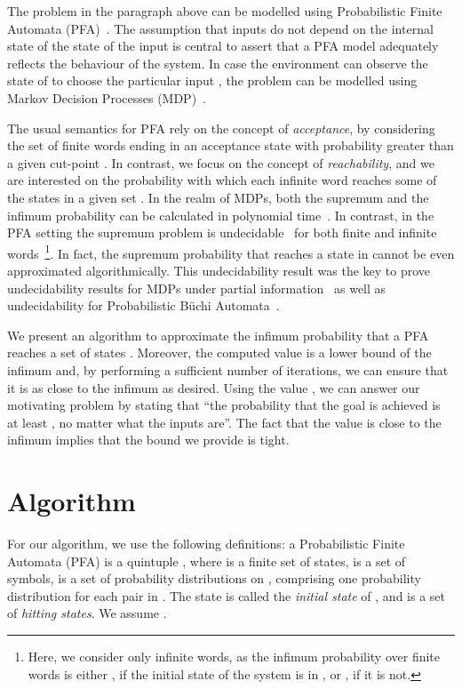 \documentclass[final,3p,times,twocolumn]{elsarticle}
\theoremstyle{plain}
\theoremstyle{definition}
\begin{document}
The problem in the paragraph above can be modelled using Probabilistic Finite
Automata (PFA)~\cite{DBLP:journals/iandc/Rabin63,DBLP:journals/ai/MadaniHC03}.
The assumption that inputs do not depend on the internal state of the
state of the input is central to assert that a PFA model adequately
reflects the behaviour of the system. In case the environment can observe
the state of  to choose the particular input , the problem
can be modelled using Markov Decision Processes (MDP)~\cite{BOOK:Puterman}.


The usual semantics for PFA rely on the concept of \emph{acceptance},
by considering the set of finite words ending in an acceptance state
with probability greater than a given cut-point . In contrast,
we focus on the concept of \emph{reachability}, and we are interested
on the probability with which each infinite word reaches some of the states
in a given set . In the realm of MDPs, both the supremum and
the infimum probability can be calculated in polynomial
time~\cite{DBLP:conf/fsttcs/BiancoA95}. In contrast, in the PFA setting
the supremum problem is undecidable~\cite{DBLP:journals/ai/MadaniHC03} for
both finite and infinite words~\footnote{Here, we consider only infinite words,
as the infimum probability over finite words is either , if the initial
state of the system is in , or , if it is not.}.
In fact, the supremum probability that  reaches a state in
 cannot be even approximated algorithmically. This undecidability
result was the key to prove undecidability results for MDPs under partial
information~\cite{DBLP:conf/formats/GiroD07} as well as undecidability
for Probabilistic B\"uchi Automata~\cite{DBLP:conf/fossacs/BaierBG08}.

We present an algorithm to approximate the infimum probability that a PFA
 reaches a set of states . Moreover, the computed value
 is a lower bound of the infimum and, by performing a
sufficient number of iterations, we can ensure that it is as close to the
infimum as desired. Using the value , we can answer our motivating
problem by stating that ``the probability that the goal is achieved is at
least , no matter what the inputs are''. The fact that the value
 is close to the infimum implies that the bound we provide is tight.

\section{Algorithm}

For our algorithm, we use the following definitions: a Probabilistic Finite
Automata (PFA) is a quintuple
, where
 is a finite set of states,  is a set of symbols,
 is a set of probability distributions on , comprising
one probability distribution  for each
pair  in . The state 
is called the \emph{initial state} of , and  is a set of
\emph{hitting states}. We assume .
\end{document}
